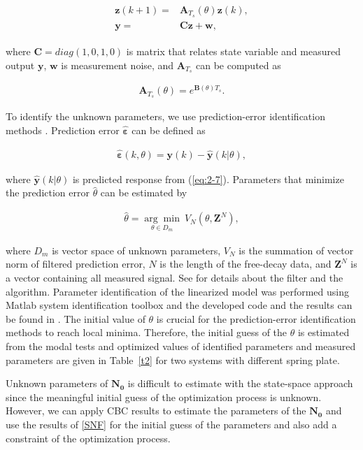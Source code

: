 \documentclass[openacc]{rsproca_new}%
\def\epsilon{\varepsilon}
\def\vec#1{\ensuremath{\mathbf{#1}}}
\newcommand{\Eref}[1]{(\ref{#1})}
\newcommand{\Tref}[1]{Table~\ref{#1}}
\begin{document}
\begin{align}\label{eq:2-7}
  \begin{split}
\vec{z}(k+1)=&\vec{A}_{T_s}(\theta)\vec{z}(k),\\
\vec{y}=&\vec{C}\vec{z}+\vec{w},
\end{split}
\end{align}

\noindent where $\vec{C}=diag(1,0,1,0)$ is matrix that relates state variable and measured output $\vec{y}$, $\vec{w}$ is measurement noise, and $\vec{A}_{T_s}$ can be computed as

\begin{align}\label{eq:2-8}
\vec{A}_{T_s}(\theta)=e^{\vec{B}(\theta)T_s}.
\end{align}


\noindent To identify the unknown parameters, we use prediction-error identification methods \cite{ljung2001system}. Prediction error \vec{\hat \epsilon} can be defined as

\begin{align}\label{eq:2-9}
\vec{\hat \epsilon}(k,\theta)=\vec{y}(k)-\hat{\vec{y}}(k|\theta),
\end{align}

\noindent where $\hat{\vec{y}}(k|\theta)$ is predicted response from \Eref{eq:2-7}. Parameters that minimize the prediction error $\hat \theta$ can be estimated by

\begin{align}\label{eq:2-10}
\hat{\theta}=\underset{\theta \in D_m}{\arg\min} \: V_N(\theta,\vec{Z}^N),
\end{align}

\noindent where $D_m$ is vector space of unknown parameters, $V_N$ is the summation of vector norm of filtered prediction error, $N$ is the length of the free-decay data, and $\vec{Z}^N$ is a vector containing all measured signal. See \cite{ljung2001system} for details about the filter and the algorithm. Parameter identification of the linearized model was performed using Matlab system identification toolbox \cite{ljung1988system} and the developed code and the results can be found in \cite{sysID}. The initial value of $\theta$ is crucial for the prediction-error identification methods to reach local minima. Therefore, the initial guess of the $\theta$ is estimated from the modal tests and optimized values of identified parameters and measured parameters are given in \Tref{t2} for two systems with different spring plate.

Unknown parameters of $\vec{N_0}$ is difficult to estimate with the state-space approach since the meaningful initial guess of the optimization process is unknown. However, we can apply CBC results to estimate the parameters of the $\vec{N_0}$ and use the results of
\ref{SNF} for the initial guess of the parameters and also add a constraint of the optimization process.
\end{document}
